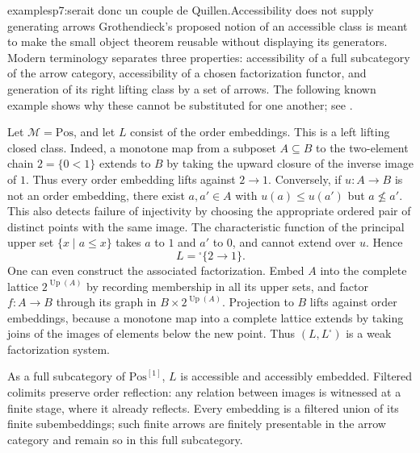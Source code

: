 \begin{dcomment}{examples}{p7:serait donc un couple de Quillen.}{Accessibility does not supply generating arrows}
Grothendieck's proposed notion of an accessible class is meant to make the small object theorem reusable without displaying its generators. Modern terminology separates three properties: accessibility of a full subcategory of the arrow category, accessibility of a chosen factorization functor, and generation of its right lifting class by a set of arrows. The following known example shows why these cannot be substituted for one another; see \citet[Introduction and Examples~3.7]{Rosicky2021Remarks}.

Let $\mathcal M=\mathrm{Pos}$, and let $L$ consist of the order embeddings. This is a left lifting closed class. Indeed, a monotone map from a subposet $A\subseteq B$ to the two-element chain $2=\{0<1\}$ extends to $B$ by taking the upward closure of the inverse image of $1$. Thus every order embedding lifts against $2\to1$. Conversely, if $u:A\to B$ is not an order embedding, there exist $a,a'\in A$ with $u(a)\leq u(a')$ but $a\not\leq a'$. This also detects failure of injectivity by choosing the appropriate ordered pair of distinct points with the same image. The characteristic function of the principal upper set $\{x\mid a\leq x\}$ takes $a$ to $1$ and $a'$ to $0$, and cannot extend over $u$. Hence
\[
 L={} ^{\square}\{2\to1\}.
\]
One can even construct the associated factorization. Embed $A$ into the complete lattice $2^{\operatorname{Up}(A)}$ by recording membership in all its upper sets, and factor $f:A\to B$ through its graph in $B\times2^{\operatorname{Up}(A)}$. Projection to $B$ lifts against order embeddings, because a monotone map into a complete lattice extends by taking joins of the images of elements below the new point. Thus $(L,L^{\square})$ is a weak factorization system.

As a full subcategory of $\mathrm{Pos}^{[1]}$, $L$ is accessible and accessibly embedded. Filtered colimits preserve order reflection: any relation between images is witnessed at a finite stage, where it already reflects. Every embedding is a filtered union of its finite subembeddings; such finite arrows are finitely presentable in the arrow category and remain so in this full subcategory.


\end{dcomment}
